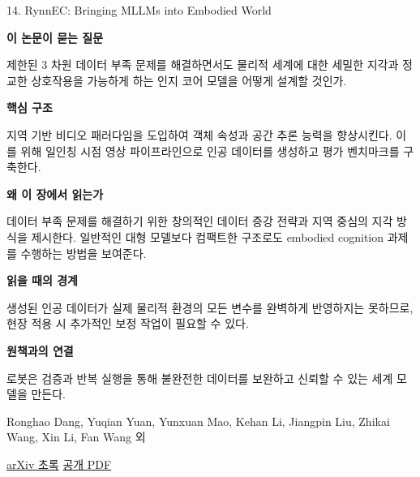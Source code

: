 \documentclass[11pt,openany]{book}
\begin{document}
\begin{termcard}{14. RynnEC: Bringing MLLMs into Embodied World}

\par

\medskip

{\sffamily\bfseries\color{deepblue} 이 논문이 묻는 질문}\par

제한된 3 차원 데이터 부족 문제를 해결하면서도 물리적 세계에 대한 세밀한 지각과 정교한 상호작용을 가능하게 하는 인지 코어 모델을 어떻게 설계할 것인가.

\smallskip

{\sffamily\bfseries\color{deepblue} 핵심 구조}\par

지역 기반 비디오 패러다임을 도입하여 객체 속성과 공간 추론 능력을 향상시킨다. 이를 위해 일인칭 시점 영상 파이프라인으로 인공 데이터를 생성하고 평가 벤치마크를 구축한다.

\smallskip

{\sffamily\bfseries\color{deepblue} 왜 이 장에서 읽는가}\par

데이터 부족 문제를 해결하기 위한 창의적인 데이터 증강 전략과 지역 중심의 지각 방식을 제시한다. 일반적인 대형 모델보다 컴팩트한 구조로도 embodied cognition 과제를 수행하는 방법을 보여준다.

\smallskip

{\sffamily\bfseries\color{coral} 읽을 때의 경계}\par

생성된 인공 데이터가 실제 물리적 환경의 모든 변수를 완벽하게 반영하지는 못하므로, 현장 적용 시 추가적인 보정 작업이 필요할 수 있다.

\smallskip

{\sffamily\bfseries\color{teal} 원책과의 연결}\par

로봇은 검증과 반복 실행을 통해 불완전한 데이터를 보완하고 신뢰할 수 있는 세계 모델을 만든다.

\medskip

{\footnotesize\color{muted} Ronghao Dang, Yuqian Yuan, Yunxuan Mao, Kehan Li, Jiangpin Liu, Zhikai Wang, Xin Li, Fan Wang 외\par

\href{https://arxiv.org/abs/2508.14160}{arXiv 초록} \quad \href{https://arxiv.org/pdf/2508.14160}{공개 PDF}\par}

\end{termcard}
\end{document}
